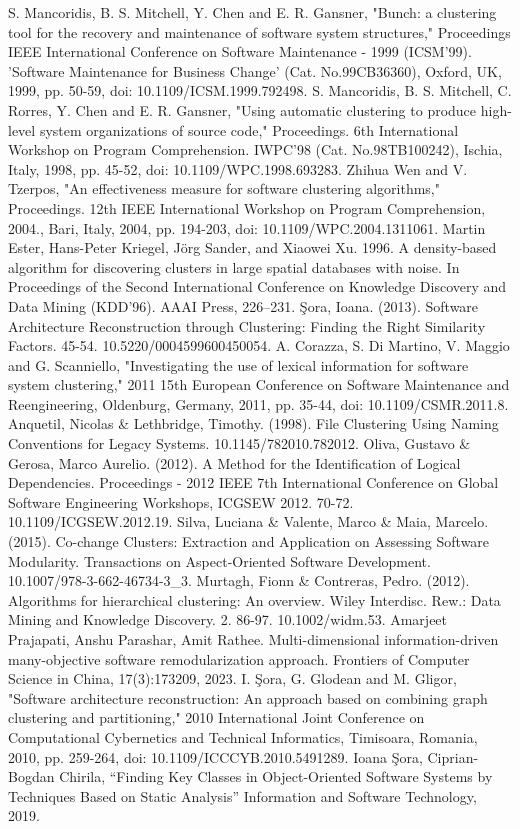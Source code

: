 \documentclass{ieeeaccess}
\begin{document}
\begin{thebibliography}{00}
 S. Mancoridis, B. S. Mitchell, Y. Chen and E. R. Gansner, "Bunch: a clustering tool for the recovery and maintenance of software system structures," Proceedings IEEE International Conference on Software Maintenance - 1999 (ICSM'99). 'Software Maintenance for Business Change' (Cat. No.99CB36360), Oxford, UK, 1999, pp. 50-59, doi: 10.1109/ICSM.1999.792498.
 S. Mancoridis, B. S. Mitchell, C. Rorres, Y. Chen and E. R. Gansner, "Using automatic clustering to produce high-level system organizations of source code," Proceedings. 6th International Workshop on Program Comprehension. IWPC'98 (Cat. No.98TB100242), Ischia, Italy, 1998, pp. 45-52, doi: 10.1109/WPC.1998.693283.
 Zhihua Wen and V. Tzerpos, "An effectiveness measure for software clustering algorithms," Proceedings. 12th IEEE International Workshop on Program Comprehension, 2004., Bari, Italy, 2004, pp. 194-203, doi: 10.1109/WPC.2004.1311061.
 Martin Ester, Hans-Peter Kriegel, Jörg Sander, and Xiaowei Xu. 1996. A density-based algorithm for discovering clusters in large spatial databases with noise. In Proceedings of the Second International Conference on Knowledge Discovery and Data Mining (KDD'96). AAAI Press, 226–231.
 Şora, Ioana. (2013). Software Architecture Reconstruction through Clustering: Finding the Right Similarity Factors. 45-54. 10.5220/0004599600450054. 
 A. Corazza, S. Di Martino, V. Maggio and G. Scanniello, "Investigating the use of lexical information for software system clustering," 2011 15th European Conference on Software Maintenance and Reengineering, Oldenburg, Germany, 2011, pp. 35-44, doi: 10.1109/CSMR.2011.8.
 Anquetil, Nicolas \& Lethbridge, Timothy. (1998). File Clustering Using Naming Conventions for Legacy Systems. 10.1145/782010.782012. 
 Oliva, Gustavo \& Gerosa, Marco Aurelio. (2012). A Method for the Identification of Logical Dependencies. Proceedings - 2012 IEEE 7th International Conference on Global Software Engineering Workshops, ICGSEW 2012. 70-72. 10.1109/ICGSEW.2012.19. 
 Silva, Luciana \& Valente, Marco \& Maia, Marcelo. (2015). Co-change Clusters: Extraction and Application on Assessing Software Modularity. Transactions on Aspect-Oriented Software Development. 10.1007/978-3-662-46734-3\_3. 
 Murtagh, Fionn \& Contreras, Pedro. (2012). Algorithms for hierarchical clustering: An overview. Wiley Interdisc. Rew.: Data Mining and Knowledge Discovery. 2. 86-97. 10.1002/widm.53. 
 Amarjeet Prajapati, Anshu Parashar, Amit Rathee. Multi-dimensional information-driven many-objective software remodularization approach. Frontiers of Computer Science in China, 17(3):173209, 2023.
 I. Şora, G. Glodean and M. Gligor, "Software architecture reconstruction: An approach based on combining graph clustering and partitioning," 2010 International Joint Conference on Computational Cybernetics and Technical Informatics, Timisoara, Romania, 2010, pp. 259-264, doi: 10.1109/ICCCYB.2010.5491289.
 Ioana Şora, Ciprian-Bogdan Chirila, “Finding Key Classes in Object-Oriented Software Systems by Techniques Based on Static Analysis”  Information and Software Technology, 2019.


\end{thebibliography}
\end{document}
